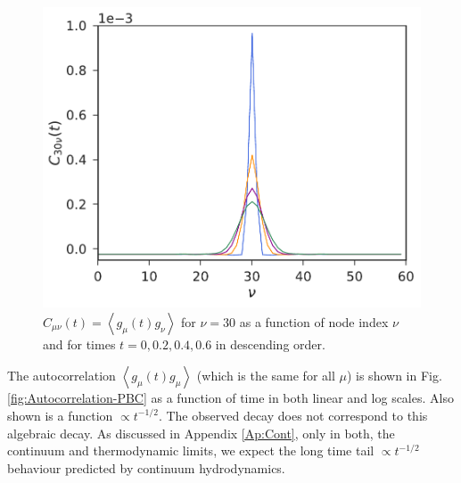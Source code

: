 \documentclass[b5paper,openright,11pt]{book}
\newcommand{\llangle}{\left\langle}
\newcommand{\rrangle}{\right\rangle}
\begin{document}
\begin{figure}[h!]
\centering
\includegraphics[scale=0.41]{Ct-mu30nu-PBC}
\caption[$C_{30\nu}(t)$ for PBC system.]{$C_{\mu\nu}(t)=\llangle  g_{\mu}(t) g_\nu\rrangle$  for $\nu=30$
 as a  function of node index  $\nu$ and for times $t=0, 0.2, 0.4, 0.6$ in descending order.}
 \label{fig:Ct-mu30nu-PBC} 
\end{figure}

The autocorrelation $\llangle  g_{\mu}(t) g_\mu\rrangle$ (which is
the same for  all $\mu$) is shown in  Fig.  \ref{fig:Autocorrelation-PBC}
as a function of time in both  linear and log scales.  Also shown is a
function $\propto  t^{-1/2}$.  The observed decay  does not correspond
to this algebraic decay.  As discussed in Appendix \ref{Ap:Cont}, only
in both,  the continuum and  thermodynamic limits, we expect  the long
time  tail   $\propto  t^{-1/2}$  behaviour  predicted   by  continuum
hydrodynamics.
\end{document}
